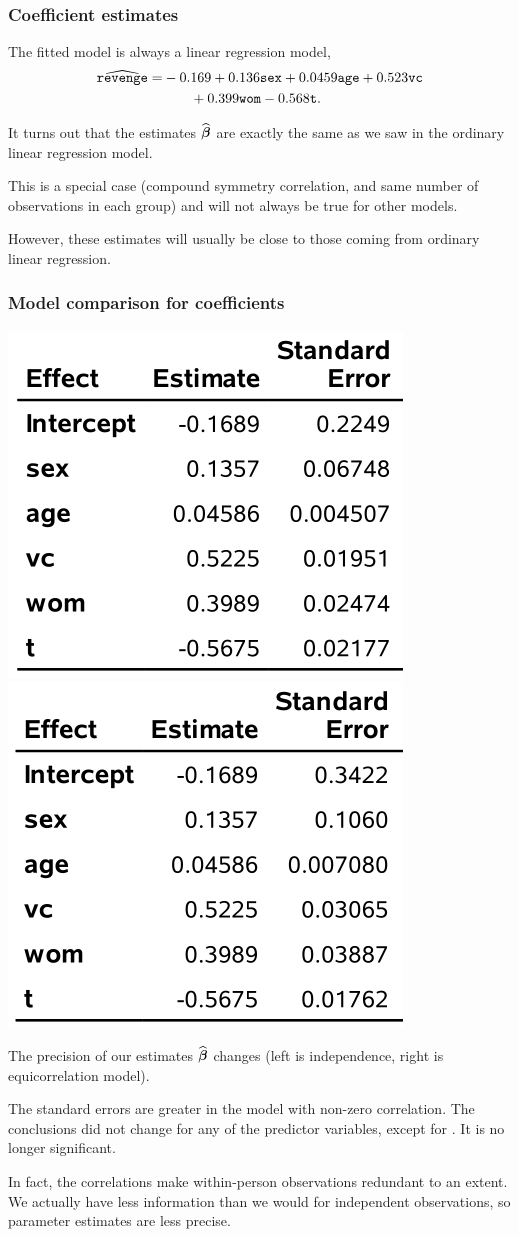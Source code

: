 \documentclass{beamer}
\begin{document}
\begin{frame}[fragile]
\frametitle{Coefficient estimates}
\bi
\item The fitted model is always a linear regression model,
\begin{align*}
\widehat{\texttt{revenge}}=&-0.169 + 0.136 \texttt{sex} + 0.0459 \texttt{age} + 0.523 \texttt{vc}\\
 & \qquad + 0.399 \texttt{wom} -0.568 \texttt{t}.
\end{align*}
\item  It turns out that the estimates $\widehat{\boldsymbol {\beta}}$ are exactly the same as we saw in the ordinary linear regression model. 
\item This is a special case (compound symmetry correlation, and same number of observations in each group) and \alert{will not always be true for other models}. 
\item However, these estimates will usually be close to those coming from ordinary linear regression. 
\ei
\end{frame}




\begin{frame}[fragile]
\frametitle{Model comparison for coefficients}

\begin{center}
\includegraphics[width = 0.35\linewidth]{img/c5/slides6-e13}
\includegraphics[width = 0.35\linewidth]{img/c5/slides6-e14}
\end{center}
\bi
\item The precision of our estimates $\widehat{\boldsymbol {\beta}}$ changes (left is independence, right is equicorrelation model).
\item The standard errors are greater in the model with non-zero correlation. The conclusions did not change for any of the predictor variables, except for . It is no longer significant.
\item In fact, the correlations make within-person observations redundant to an extent. We actually have less information than we would for independent observations, so parameter estimates are less precise.

\ei
\end{frame}
\end{document}
